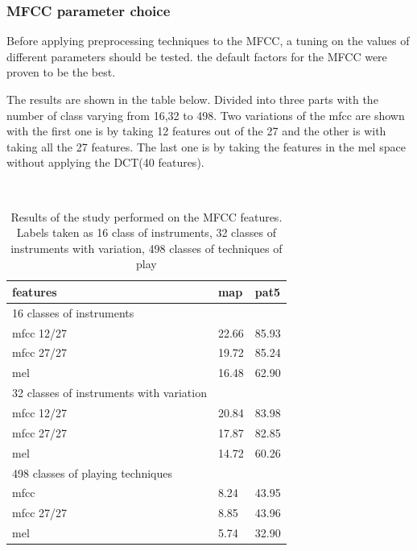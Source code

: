 \documentclass[hidelinks,12pt]{report}
\begin{document}
\subsubsection{MFCC parameter choice}
Before applying preprocessing techniques to the MFCC, a tuning on the values of different parameters should be tested. the default factors for the MFCC were proven to be the best.

The results are shown in the table below. Divided into three parts with the number of class varying from 16,32 to 498. Two variations of the mfcc are shown with the first one is by taking 12 features out of the 27 and the other is with taking all the 27 features. The last one is by taking the features in the mel space without applying the DCT(40 features).\\

\begin{table} [H]
\begin{center} 
\ 
 \setlength{\tabcolsep}{.16667em} 
\begin{tabular}{ | l | l | l | }
\hline 
features & map & pat5 \\
\hline
\hline
16 classes of instruments    \\ 
\hline 
mfcc 12/27  & 22.66 & 85.93  \\ 

mfcc 27/27  & 19.72 & 85.24  \\ 

mel &  16.48 & 62.90 \\

 \hline 32 classes of instruments with variation  \\ \hline
mfcc 12/27  & 20.84 & 83.98  \\ 
 
mfcc 27/27 & 17.87 & 82.85  \\ 

mel  & 14.72 & 60.26  \\ \hline

498 classes of playing techniques   \\ \hline

mfcc  & 8.24 & 43.95 \\ 

mfcc 27/27  & 8.85 & 43.96 \\
mel  & 5.74 & 32.90  \\ \hline
\end{tabular} 
\end{center} 
\caption{Results of the study performed on the MFCC features. Labels taken as 16 class of instruments, 32 classes of instruments with variation, 498 classes of techniques of play} 
\label{you} 
\end{table} 
\end{document}
